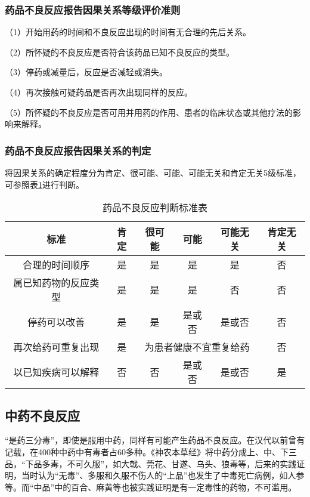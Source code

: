 \subsubsection{药品不良反应报告因果关系等级评价准则}

（1）开始用药的时间和不良反应出现的时间有无合理的先后关系。

（2）所怀疑的不良反应是否符合该药品已知不良反应的类型。

（3）停药或减量后，反应是否减轻或消失。

（4）再次接触可疑药品是否再次出现同样的反应。

（5）所怀疑的不良反应是否可用并用药的作用、患者的临床状态或其他疗法的影响来解释。

\subsubsection{药品不良反应报告因果关系的判定}

将因果关系的确定程度分为肯定、很可能、可能、可能无关和肯定无关5级标准，可参照表\ref{tab3-2}进行判断。

\begin{table}[ht]
    \caption{药品不良反应判断标准表}
    \label{tab3-2}
    \centering
    \begin{tabular}{cccccc}
    \toprule
    标准 & 肯定 & 很可能 & 可能 & 可能无关 & 肯定无关\\
    \midrule
    合理的时间顺序 & 是 & 是 & 是 & 是 & 否\\
    属已知药物的反应类型 & 是 & 是 & 是 & 否 & 否\\
    停药可以改善 & 是 & 是 & 是或否 & 是或否 & 否\\
    再次给药可重复出现 & 是 & \multicolumn{3}{c}{为患者健康不宜重复给药} & 否 \\
    以已知疾病可以解释 & 否 & 否 & 是或否 & 是或否 & 是\\
    \bottomrule
    \end{tabular}
\end{table}

\subsection{中药不良反应}

“是药三分毒”，即使是服用中药，同样有可能产生药品不良反应。在汉代以前曾有记载，在400种中药中有毒者占60多种。《神农本草经》将中药分成上、中、下三品，“下品多毒，不可久服”，如大戟、莞花、甘遂、乌头、狼毒等，后来的实践证明，当时认为“无毒”、多服和久服不伤人的“上品”也发生了中毒死亡病例，如人参等。而“中品”中的百合、麻黄等也被实践证明是有一定毒性的药物，不可滥用。

